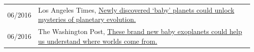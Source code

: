 \begin{tabular}{ll}
06/2016 & Los Angeles Times, \href{https://www.latimes.com/science/sciencenow/la-sci-sn-young-exoplanet-20160620-snap-story.html}{Newly discovered `baby' planets could unlock mysteries of planetary evolution.} \\
06/2016 & The Washington Post, \href{https://www.washingtonpost.com/news/speaking-of-science/wp/2016/06/20/these-brand-new-baby-exoplanets-could-help-us-understand-where-worlds-come-from/}{These brand new baby exoplanets could help us understand where worlds come from.}
\end{tabular}
